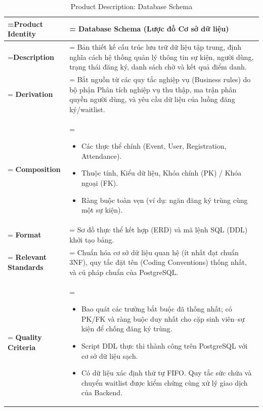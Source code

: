 \documentclass{article}
\begin{document}
\begin{table}[H]
    \centering
    \caption{Product Description: Database Schema}
    \renewcommand{\arraystretch}{1.5}
    \begin{tabularx}{\textwidth}{|>{\hsize=0.5\hsize\linewidth=\hsize\bfseries}X|>{\hsize=1.5\hsize\linewidth=\hsize}X|}
        \hline
        Product Identity & \textbf{Database Schema} (Lược đồ Cơ sở dữ liệu) \\
        \hline
        Description & Bản thiết kế cấu trúc lưu trữ dữ liệu tập trung, định nghĩa cách hệ thống quản lý thông tin sự kiện, người dùng, trạng thái đăng ký, danh sách chờ và kết quả điểm danh. \\
        \hline
        Derivation & Bắt nguồn từ các quy tắc nghiệp vụ (Business rules) do bộ phận Phân tích nghiệp vụ thu thập, ma trận phân quyền người dùng, và yêu cầu dữ liệu của luồng đăng ký/waitlist. \\
        \hline
        Composition & 
        \vspace{-0.8em}
        \begin{itemize}[leftmargin=*, nosep]
            \item Các thực thể chính (Event, User, Registration, Attendance).
            \item Thuộc tính, Kiểu dữ liệu, Khóa chính (PK) / Khóa ngoại (FK).
            \item Ràng buộc toàn vẹn (ví dụ: ngăn đăng ký trùng cùng một sự kiện).
        \end{itemize}
        \vspace{-1em} \\
        \hline
        Format & Sơ đồ thực thể kết hợp (ERD) và mã lệnh SQL (DDL) khởi tạo bảng. \\
        \hline
        Relevant Standards & Chuẩn hóa cơ sở dữ liệu quan hệ (ít nhất đạt chuẩn 3NF), quy tắc đặt tên (Coding Conventions) thống nhất, và cú pháp chuẩn của PostgreSQL. \\
        \hline
        Quality Criteria & 
        \vspace{-0.8em}
        \begin{itemize}[leftmargin=*, nosep]
            \item Bao quát các trường bắt buộc đã thống nhất; có PK/FK và ràng buộc duy nhất cho cặp sinh viên--sự kiện để chống đăng ký trùng.
            \item Script DDL thực thi thành công trên PostgreSQL với cơ sở dữ liệu sạch.
            \item Có dữ liệu xác định thứ tự FIFO. Quy tắc sức chứa và chuyển waitlist được kiểm chứng cùng xử lý giao dịch của Backend.
        \end{itemize}
        \vspace{-1em} \\
        \hline
    \end{tabularx}
\end{table}
\end{document}
